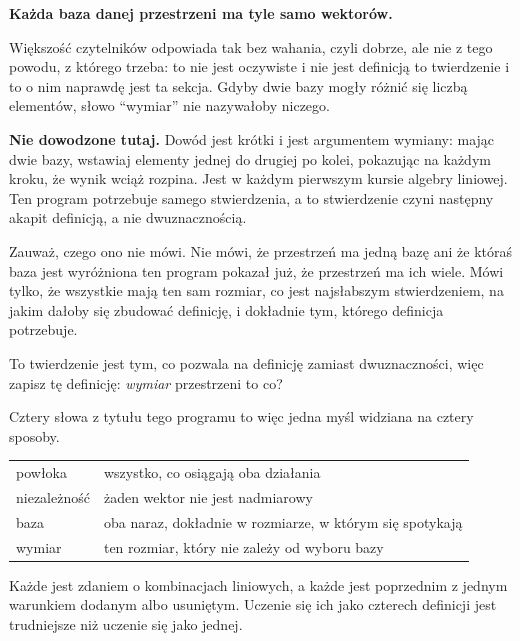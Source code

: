 \begin{fr}

\medskip
\noindent
\textbf{Każda baza danej przestrzeni ma tyle samo wektorów.}

\medskip
\noindent
Większość czytelników odpowiada tak bez wahania, czyli dobrze, ale nie z tego
powodu, z którego trzeba: to nie jest oczywiste i nie jest definicją \dash{} to
twierdzenie i to o nim naprawdę jest ta sekcja. Gdyby dwie bazy mogły różnić się liczbą elementów,
słowo \enquote{wymiar} nie nazywałoby niczego.

\begin{rigourbox}
\textbf{Nie dowodzone tutaj.} Dowód jest krótki i jest argumentem wymiany:
mając dwie bazy, wstawiaj elementy jednej do drugiej po kolei, pokazując na
każdym kroku, że wynik wciąż rozpina. Jest w każdym pierwszym kursie algebry
liniowej. Ten program potrzebuje samego stwierdzenia, a to stwierdzenie czyni
następny akapit definicją, a nie dwuznacznością.
\end{rigourbox}

Zauważ, czego ono nie mówi. Nie mówi, że przestrzeń ma jedną bazę ani że
któraś baza jest wyróżniona \dash{} ten program pokazał już, że przestrzeń ma
ich wiele. Mówi tylko, że wszystkie mają ten sam rozmiar, co jest najsłabszym
stwierdzeniem, na jakim dałoby się zbudować definicję, i dokładnie tym,
którego definicja potrzebuje.

To twierdzenie jest tym, co pozwala na definicję zamiast dwuznaczności, więc
zapisz tę definicję: \emph{wymiar} przestrzeni to co?
\dotline
\nextframe
\end{fr}

\begin{fr}

Cztery słowa z tytułu tego programu to więc jedna myśl widziana na cztery
sposoby.

\begin{center}
\begin{tabularx}{\linewidth}{@{}lX@{}}
\toprule
powłoka & wszystko, co osiągają oba działania \\
niezależność & żaden wektor nie jest nadmiarowy \\
baza & oba naraz, dokładnie w rozmiarze, w którym się spotykają \\
wymiar & ten rozmiar, który nie zależy od wyboru bazy \\
\bottomrule
\end{tabularx}
\end{center}

Każde jest zdaniem o kombinacjach liniowych, a każde jest poprzednim z jednym
warunkiem dodanym albo usuniętym. Uczenie się ich jako czterech definicji jest
trudniejsze niż uczenie się jako jednej.
\end{fr}

